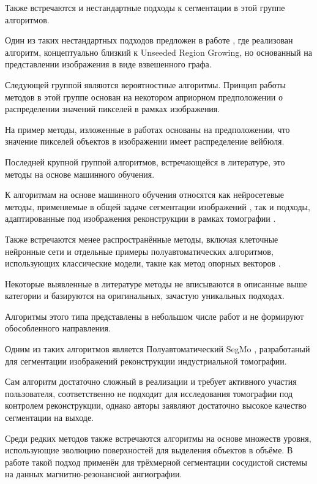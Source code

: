 Также встречаются и нестандартные подходы к сегментации в этой группе алгоритмов.

Один из таких нестандартных подходов предложен в работе \cite{felzenszwalb2004efficient}, где реализован алгоритм, концептуально близкий к Unseeded Region Growing, но основанный на представлении изображения в виде взвешенного графа.

Следующей группой являются вероятностные алгоритмы. Принцип работы методов в этой группе основан на некотором априорном предположении о распределении значений пикселей в рамках изображения.

На пример методы, изложенные в работах \cite{hu2003volumetric, ayed2006unsupervised} основаны на предположении, что значение пикселей объектов в  изображении имеет распределение вейбюля.

Последней крупной группой алгоритмов, встречающейся в литературе, это методы на основе машинного обучения.

К алгоритмам на основе машинного обучения относятся как нейросетевые методы, применяемые в общей задаче сегментации изображений \cite{lu20193d, ха2016свёрточная}, так и подходы, адаптированные под изображения реконструкции в рамках томографии \cite{milletari2016v}. 

Также встречаются менее распространённые методы, включая клеточные нейронные сети \cite{liu2011industrial} и отдельные примеры полуавтоматических алгоритмов, использующих классические модели, такие как метод опорных векторов \cite{lang2022ai, gonella2019semi}.

Некоторые выявленные в литературе методы не вписываются в описанные выше категории и базируются на оригинальных, зачастую уникальных подходах. 

Алгоритмы этого типа представлены в небольшом числе работ и не формируют обособленного направления.

Одним из таких алгоритмов является Полуавтоматический SegMo \cite{nagai2019segmo}, разработаный для сегментации изображений реконструкции индустриальной томографии.

Сам алгоритм достаточно сложный в реализации и требует активного участия пользователя, соответственно не подходит для исследования томографии под контролем реконструкции, однако авторы заявляют достаточно высокое качество сегментации на выходе.

Среди редких методов также встречаются алгоритмы на основе множеств уровня, использующие эволюцию поверхностей для выделения объектов в объёме. В работе \cite{farag20043d} такой подход применён для трёхмерной сегментации сосудистой системы на данных магнитно-резонансной ангиографии.

